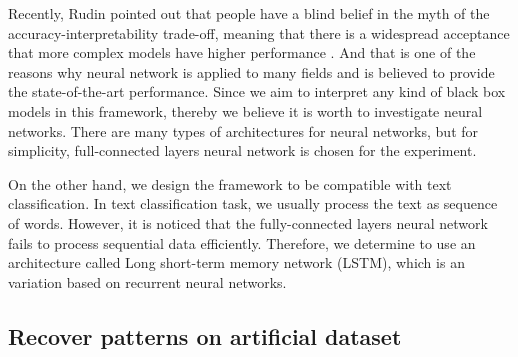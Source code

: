 Recently, Rudin pointed out that people have a blind belief in the myth of the accuracy-interpretability trade-off, meaning that there is a widespread acceptance that more complex models have higher performance \cite{rudin2019stop}. And that is one of the reasons why neural network is applied to many fields and is believed to provide the state-of-the-art performance. Since we aim to interpret any kind of black box models in this framework, thereby we believe it is worth to investigate neural networks. There are many types of architectures for neural networks, but for simplicity, full-connected layers neural network is chosen for the experiment. 

On the other hand, we design the framework to be compatible with text classification. In text classification task, we usually process the text as sequence of words. However, it is noticed that the fully-connected layers neural network fails to process sequential data efficiently. Therefore, we determine to use an architecture called Long short-term memory network (LSTM), which is an variation based on recurrent neural networks.




\subsection{Recover patterns on artificial dataset} 


